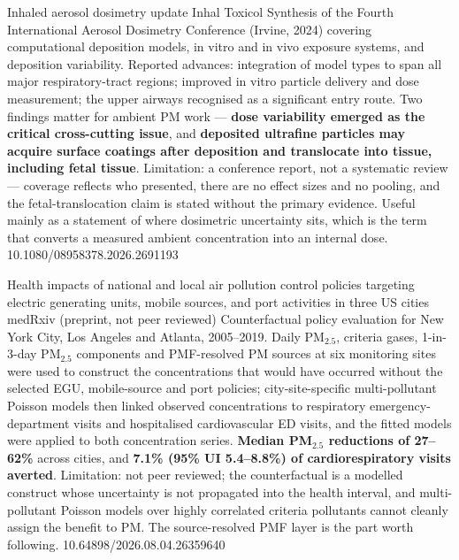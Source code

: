 \documentclass[10pt]{article}
\begin{document}
{Inhaled aerosol dosimetry update}
{Inhal Toxicol}
{Synthesis of the Fourth International Aerosol Dosimetry Conference (Irvine, 2024)
covering computational deposition models, in vitro and in vivo exposure systems, and
deposition variability. Reported advances: integration of model types to span all major
respiratory-tract regions; improved in vitro particle delivery and dose measurement; the
upper airways recognised as a significant entry route. Two findings matter for ambient PM
work --- \textbf{dose variability emerged as the critical cross-cutting issue}, and
\textbf{deposited ultrafine particles may acquire surface coatings after deposition and
translocate into tissue, including fetal tissue}. Limitation: a conference report, not a
systematic review --- coverage reflects who presented, there are no effect sizes and no
pooling, and the fetal-translocation claim is stated without the primary evidence. Useful
mainly as a statement of where dosimetric uncertainty sits, which is the term that
converts a measured ambient concentration into an internal dose.}
{10.1080/08958378.2026.2691193}


{Health impacts of national and local air pollution control policies targeting electric
generating units, mobile sources, and port activities in three US cities}
{medRxiv (preprint, not peer reviewed)}
{Counterfactual policy evaluation for New York City, Los Angeles and Atlanta, 2005--2019.
Daily PM$_{2.5}$, criteria gases, 1-in-3-day PM$_{2.5}$ components and PMF-resolved PM
sources at six monitoring sites were used to construct the concentrations that would have
occurred without the selected EGU, mobile-source and port policies; city-site-specific
multi-pollutant Poisson models then linked observed concentrations to respiratory
emergency-department visits and hospitalised cardiovascular ED visits, and the fitted
models were applied to both concentration series. \textbf{Median PM$_{2.5}$ reductions of
27--62\%} across cities, and \textbf{7.1\% (95\% UI 5.4--8.8\%) of cardiorespiratory
visits averted}. Limitation: not peer reviewed; the counterfactual is a modelled construct
whose uncertainty is not propagated into the health interval, and multi-pollutant Poisson
models over highly correlated criteria pollutants cannot cleanly assign the benefit to PM.
The source-resolved PMF layer is the part worth following.}
{10.64898/2026.08.04.26359640}
\end{document}
